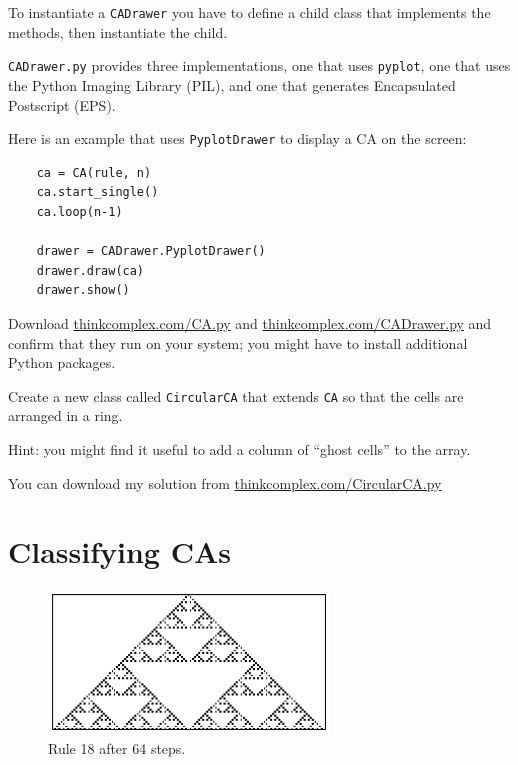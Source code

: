 \documentclass[10pt]{book}
\begin{document}
To instantiate a {\tt CADrawer} you have to define a child class
that implements the methods, then instantiate the child.

{\tt CADrawer.py} provides three implementations, one that uses
{\tt pyplot}, one that uses the Python Imaging Library (PIL), and
one that generates Encapsulated Postscript (EPS).

Here is an example that uses {\tt PyplotDrawer} to display a
CA on the screen:

\begin{verbatim}
    ca = CA(rule, n)
    ca.start_single()
    ca.loop(n-1)

    drawer = CADrawer.PyplotDrawer()
    drawer.draw(ca)
    drawer.show()
\end{verbatim}

\begin{exercise}

Download \url{thinkcomplex.com/CA.py} and \url{thinkcomplex.com/CADrawer.py}
and confirm that they run on your system; you might have to install
additional Python packages.

Create a new class called {\tt CircularCA} that extends
{\tt CA} so that the cells are arranged in a ring.

Hint: you might find it useful to add a column of ``ghost cells'' to
the array.

You can download my solution from
\url{thinkcomplex.com/CircularCA.py}

\end{exercise}


\section{Classifying CAs}

\begin{figure}
\centerline{\includegraphics[height=1.5in]{figs/rule-18-64.pdf}}
\caption{Rule 18 after 64 steps.\label{fig.rule18}}
\end{figure}
\end{document}

